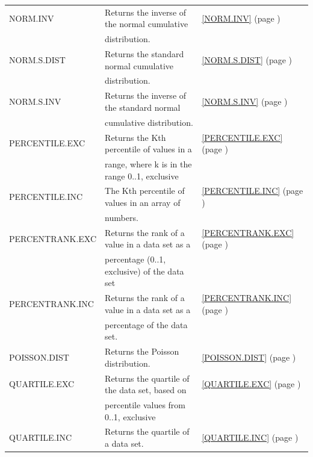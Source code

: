 \begin{center}
\begin{longtable}{l l l }
		NORM.INV & Returns the inverse of the normal cumulative  &  \ref{NORM.INV} (page \pageref{NORM.INV}) \index{Spreadsheet Functions!NORM.INV} \\
		& distribution. &   \\
		NORM.S.DIST & Returns the standard normal cumulative  &  \ref{NORM.S.DIST} (page \pageref{NORM.S.DIST}) \index{Spreadsheet Functions!NORM.S.DIST} \\
		& distribution. &   \\
		NORM.S.INV & Returns the inverse of the standard normal  &  \ref{NORM.S.INV} (page \pageref{NORM.S.INV}) \index{Spreadsheet Functions!NORM.S.INV} \\
		& cumulative distribution. &   \\
		PERCENTILE.EXC & Returns the Kth percentile of values in a &  \ref{PERCENTILE.EXC} (page \pageref{PERCENTILE.EXC}) \index{Spreadsheet Functions!PERCENTILE.EXC} \\
		& range, where k is in the range 0..1, exclusive &   \\
		PERCENTILE.INC & The Kth percentile of values in an array of  &  \ref{PERCENTILE.INC} (page \pageref{PERCENTILE.INC}) \index{Spreadsheet Functions!PERCENTILE.INC} \\
		& numbers. &   \\
		PERCENTRANK.EXC & Returns the rank of a value in a data set as a  &  \ref{PERCENTRANK.EXC} (page \pageref{PERCENTRANK.EXC}) \index{Spreadsheet Functions!PERCENTRANK.EXC} \\
		& percentage (0..1, exclusive) of the data set &   \\
		PERCENTRANK.INC & Returns the rank of a value in a data set as a &  \ref{PERCENTRANK.INC} (page \pageref{PERCENTRANK.INC}) \index{Spreadsheet Functions!PERCENTRANK.INC} \\
		& percentage of the data set. &   \\
		POISSON.DIST & Returns the Poisson distribution.  &  \ref{POISSON.DIST} (page \pageref{POISSON.DIST}) \index{Spreadsheet Functions!POISSON.DIST} \\
		QUARTILE.EXC & Returns the quartile of the data set, based on &  \ref{QUARTILE.EXC} (page \pageref{QUARTILE.EXC}) \index{Spreadsheet Functions!QUARTILE.EXC } \\
		& percentile values from 0..1, exclusive &   \\
		QUARTILE.INC & Returns the quartile of a data set. &  \ref{QUARTILE.INC} (page \pageref{QUARTILE.INC}) \index{Spreadsheet Functions!QUARTILE.INC} \\

\end{longtable}
\end{center}
